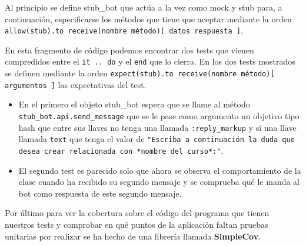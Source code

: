 Al principio se define stub\_bot que actúa a la vez como mock y stub para, a continuación, especificarse los métodos que tiene que aceptar mediante la orden \texttt{allow(stub).to receive(nombre método)[ datos respuesta ]}.
\par
En esta fragmento de código podemos encontrar dos tests que vienen compredidos entre el \texttt{it .. do} y el \texttt{end} que lo cierra. En los dos tests mostrados  se definen mediante la orden \texttt{expect(stub).to receive(nombre método)[  argumentos ]} las expectativas del test.
\begin{itemize}
 \item En el primero el objeto stub\_bot espera que se llame al método \texttt{stub\_bot.api.send\_message} que se le pase como argumento un objetivo tipo hash que entre sus llaves no tenga una llamada \texttt{:reply\_markup} y sí una llave llamada \texttt{text} que tenga el valor de \texttt{"Escriba a continuación la duda que desea crear relacionada con *nombre del curso*:"}. 
 \item El segundo test es parecido solo que ahora se observa el comportamiento de la clase cuando ha recibido su segundo mensaje y se comprueba qué le manda al bot como respuesta de este segundo mensaje.
 \end{itemize}
 \par
 
 Por último para ver la cobertura sobre el código del programa que tienen nuestros tests y comprobar en qué puntos de la aplicación faltan pruebas unitarias por realizar se ha hecho de una librería llamada \textbf{SimpleCov}.
